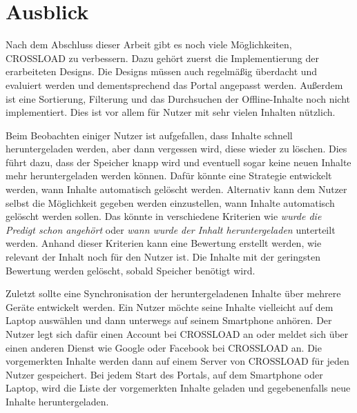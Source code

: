 \section{Ausblick}
Nach dem Abschluss dieser Arbeit gibt es noch viele Möglichkeiten, CROSSLOAD zu verbessern. Dazu gehört zuerst die Implementierung der erarbeiteten Designs. Die Designs müssen auch regelmäßig überdacht und evaluiert werden und dementsprechend das Portal angepasst werden. Außerdem ist eine Sortierung, Filterung und das Durchsuchen der Offline-Inhalte noch nicht implementiert. Dies ist vor allem für Nutzer mit sehr vielen Inhalten nützlich. 

Beim Beobachten einiger Nutzer ist aufgefallen, dass Inhalte schnell heruntergeladen werden, aber dann vergessen wird, diese wieder zu löschen. Dies führt dazu, dass der Speicher knapp wird und eventuell sogar keine neuen Inhalte mehr heruntergeladen werden können. Dafür könnte eine Strategie entwickelt werden, wann Inhalte automatisch gelöscht werden. Alternativ kann dem Nutzer selbst die Möglichkeit gegeben werden einzustellen, wann Inhalte automatisch gelöscht werden sollen. Das könnte in verschiedene Kriterien wie \textit{wurde die Predigt schon angehört} oder \textit{wann wurde der Inhalt heruntergeladen} unterteilt werden. Anhand dieser Kriterien kann eine Bewertung erstellt werden, wie relevant der Inhalt noch für den Nutzer ist. Die Inhalte mit der geringsten Bewertung werden gelöscht, sobald Speicher benötigt wird.

Zuletzt sollte eine Synchronisation der heruntergeladenen Inhalte über mehrere Geräte entwickelt werden. Ein Nutzer möchte seine Inhalte vielleicht auf dem Laptop auswählen und dann unterwegs auf seinem Smartphone anhören. Der Nutzer legt sich dafür einen Account bei CROSSLOAD an oder meldet sich über einen anderen Dienst wie Google oder Facebook bei CROSSLOAD an. Die vorgemerkten Inhalte werden dann auf einem Server von CROSSLOAD für jeden Nutzer gespeichert. Bei jedem Start des Portals, auf dem Smartphone oder Laptop, wird die Liste der vorgemerkten Inhalte geladen und gegebenenfalls neue Inhalte heruntergeladen. 
